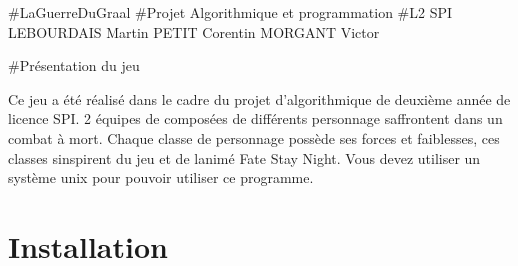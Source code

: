 \#\+La\+Guerre\+Du\+Graal \#\+Projet Algorithmique et programmation \#\+L2 S\+PI L\+E\+B\+O\+U\+R\+D\+A\+IS Martin P\+E\+T\+IT Corentin M\+O\+R\+G\+A\+NT Victor

\#\+Présentation du jeu

Ce jeu a été réalisé dans le cadre du projet d’algorithmique de deuxième année de licence S\+PI. 2 équipes de composées de différents personnage s\textquotesingle{}affrontent dans un combat à mort. Chaque classe de personnage possède ses forces et faiblesses, ces classes s\textquotesingle{}inspirent du jeu et de l\textquotesingle{}animé Fate Stay Night. Vous devez utiliser un système unix pour pouvoir utiliser ce programme.

\section*{Installation}

